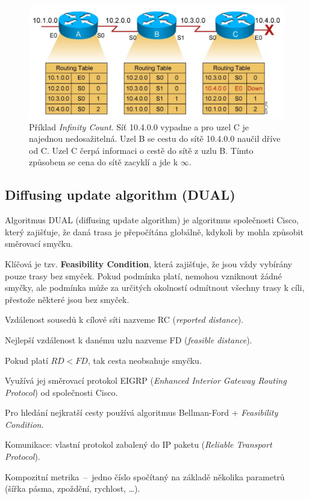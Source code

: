 \begin{figure}[H]
    \centering
    \includegraphics[width=1\linewidth]{rip_counting_infinity.pdf}
    \caption{Příklad \textit{Infinity Count}. Síť 10.4.0.0 vypadne a pro uzel C je najednou nedosažitelná. Uzel B se cestu do sítě 10.4.0.0 naučil dříve od C. Uzel C čerpá informaci o cestě do sítě z uzlu B. Tímto způsobem se cena do sítě zacyklí a jde k $\infty$.}
\end{figure}

\subsection{Diffusing update algorithm (DUAL)}

\begin{compactitem}
    \item Algoritmus DUAL (diffusing update algorithm) je algoritmus společnosti Cisco, který zajišťuje, že daná trasa je přepočítána globálně, kdykoli by mohla způsobit směrovací smyčku.
    \item Klíčová je tzv. \textbf{Feasibility Condition}, která zajišťuje, že jsou vždy vybírány pouze trasy bez smyček. Pokud podmínka platí, nemohou vzniknout žádné smyčky, ale podmínka může za určitých okolností odmítnout všechny trasy k cíli, přestože některé jsou bez smyček. \begin{compactitem}
        \item Vzdálenost sousedů k cílové síti nazveme RC (\textit{reported distance}).
        \item Nejlepší vzdálenost k danému uzlu nazveme FD (\textit{feasible distance}).
        \item Pokud platí $RD < FD$, tak cesta neobsahuje smyčku.
    \end{compactitem}
    \item Využívá jej směrovací protokol EIGRP (\textit{Enhanced Interior Gateway Routing Protocol}) od společnosti Cisco. \begin{compactitem}
        \item Pro hledání nejkratší cesty používá algoritmus Bellman-Ford + \textit{Feasibility Condition}.
        \item Komunikace: vlastní protokol zabalený do IP paketu (\textit{Reliable Transport Protocol}).
        \item Kompozitní metrika~--~jedno číslo spočítaný na základě několika parametrů (šířka pásma, zpoždění, rychlost, \dots).
    \end{compactitem}
\end{compactitem}

